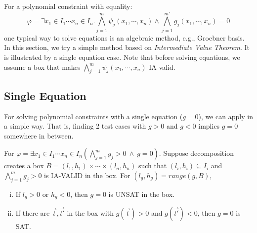 \documentclass[runningheads,a4paper,oribibl]{llncs}
\begin{document}
For a polynomial constraint with equality:
\[\varphi = \exists x_1 \in I_1 \cdots x_n \in I_n.
\bigwedge \limits_{j=1}^m \psi_j(x_1,\cdots,x_n) \wedge
\bigwedge \limits_{j=1}^{m'} g_j(x_1,\cdots,x_n) = 0\]
one typical way to solve equations is an algebraic method, e.g., Groebner basis.
In this section, we try a simple method based on
{\em Intermediate Value Theorem}. It is illustrated by a single equation case.
Note that before solving equations, we assume a box
that makes $\bigwedge \limits_{j=1}^m \psi_j(x_1,\cdots,x_n)$ IA-valid. 

\subsection{Single Equation}
For solving polynomial constraints with a single equation (${g=0}$),
we can apply in a simple way. 
That is, finding 2 test cases with $g > 0$ and $g < 0$ implies 
$g=0$ somewhere in between. 

\begin{lemma} \label{lemma:ivt}
For $\varphi = \exists x_1 \in I_1 \cdots x_n \in I_n
(\bigwedge \limits_{j=1}^m g_j > 0~\wedge~g = 0)$.
Suppose decomposition creates a box
$B = (l_1, h_1) \times \cdots \times (l_n, h_n)$
such that
$(l_i, h_i) \subseteq I_i$ and 
$\bigwedge \limits_{j=1}^m g_j > 0$ is IA-VALID in the box.
For $(l_g, h_g) = range(g, B)$, 
\begin{enumerate}[(i)]
\item If $l_g > 0$ or $h_g < 0$, then $g = 0$ is UNSAT in the box. 
\item If there are $\vec{t},\vec{t'}$ in the box
  with $g(\vec{t}) > 0$ and $g(\vec{t'}) < 0$, then $g = 0$ is SAT.
\end{enumerate}
\end{lemma}
\end{document}
